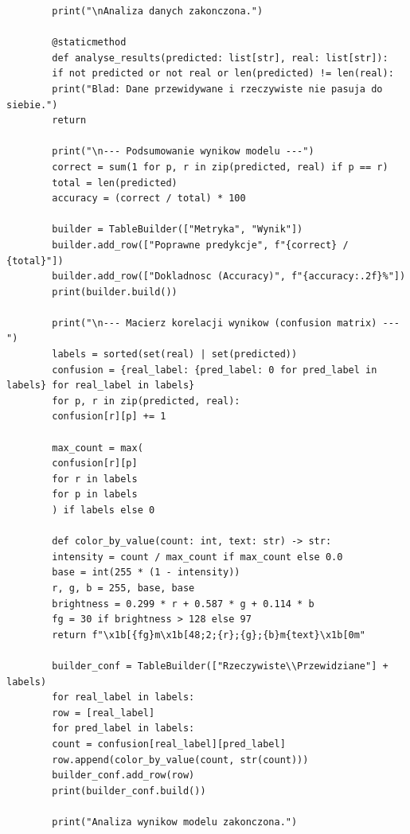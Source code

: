 \documentclass[12pt,a4paper]{article}
\begin{document}
\begin{lstlisting}
		print("\nAnaliza danych zakonczona.")
		
		@staticmethod
		def analyse_results(predicted: list[str], real: list[str]):
		if not predicted or not real or len(predicted) != len(real):
		print("Blad: Dane przewidywane i rzeczywiste nie pasuja do siebie.")
		return
		
		print("\n--- Podsumowanie wynikow modelu ---")
		correct = sum(1 for p, r in zip(predicted, real) if p == r)
		total = len(predicted)
		accuracy = (correct / total) * 100
		
		builder = TableBuilder(["Metryka", "Wynik"])
		builder.add_row(["Poprawne predykcje", f"{correct} / {total}"])
		builder.add_row(["Dokladnosc (Accuracy)", f"{accuracy:.2f}%"])
		print(builder.build())
		
		print("\n--- Macierz korelacji wynikow (confusion matrix) ---")
		labels = sorted(set(real) | set(predicted))
		confusion = {real_label: {pred_label: 0 for pred_label in labels} for real_label in labels}
		for p, r in zip(predicted, real):
		confusion[r][p] += 1
		
		max_count = max(
		confusion[r][p]
		for r in labels
		for p in labels
		) if labels else 0
		
		def color_by_value(count: int, text: str) -> str:
		intensity = count / max_count if max_count else 0.0
		base = int(255 * (1 - intensity))
		r, g, b = 255, base, base
		brightness = 0.299 * r + 0.587 * g + 0.114 * b
		fg = 30 if brightness > 128 else 97
		return f"\x1b[{fg}m\x1b[48;2;{r};{g};{b}m{text}\x1b[0m"
		
		builder_conf = TableBuilder(["Rzeczywiste\\Przewidziane"] + labels)
		for real_label in labels:
		row = [real_label]
		for pred_label in labels:
		count = confusion[real_label][pred_label]
		row.append(color_by_value(count, str(count)))
		builder_conf.add_row(row)
		print(builder_conf.build())
		
		print("Analiza wynikow modelu zakonczona.")
	\end{lstlisting}
	
\end{document}
